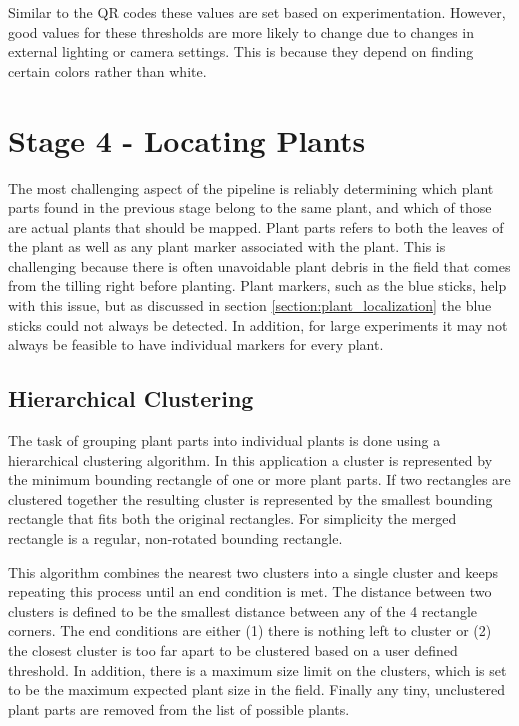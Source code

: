 Similar to the QR codes these values are set based on experimentation.   However, good values for these thresholds are more likely to change due to changes in external lighting or camera settings.  This is because they depend on finding certain colors rather than white.  

\section{Stage 4 - Locating Plants}
\label{processing-stage4}

The most challenging aspect of the pipeline is reliably determining which plant parts found in the previous stage belong to the same plant, and which of those are actual plants that should be mapped.  Plant parts refers to both the leaves of the plant as well as any plant marker associated with the plant.  This is challenging because there is often unavoidable plant debris in the field that comes from the tilling right before planting. Plant markers, such as the blue sticks, help with this issue, but as discussed in section \ref{section:plant_localization} the blue sticks could not always be detected.  In addition, for large experiments it may not always be feasible to have individual markers for every plant.  

\subsection{Hierarchical Clustering}

The task of grouping plant parts into individual plants is done using a hierarchical clustering algorithm.  In this application a cluster is represented by the minimum bounding rectangle of one or more plant parts.  If two rectangles are clustered together the resulting cluster is represented by the smallest bounding rectangle that fits both the original rectangles.  For simplicity the merged rectangle is a regular, non-rotated bounding rectangle. 

This algorithm combines the nearest two clusters into a single cluster and keeps repeating this process until an end condition is met.  The distance between two clusters is defined to be the smallest distance between any of the 4 rectangle corners.  The end conditions are either (1) there is nothing left to cluster or (2) the closest cluster is too far apart to be clustered based on a user defined threshold.  In addition, there is a maximum size limit on the clusters, which is set to be the maximum expected plant size in the field.  Finally any tiny, unclustered plant parts are removed from the list of possible plants. 

